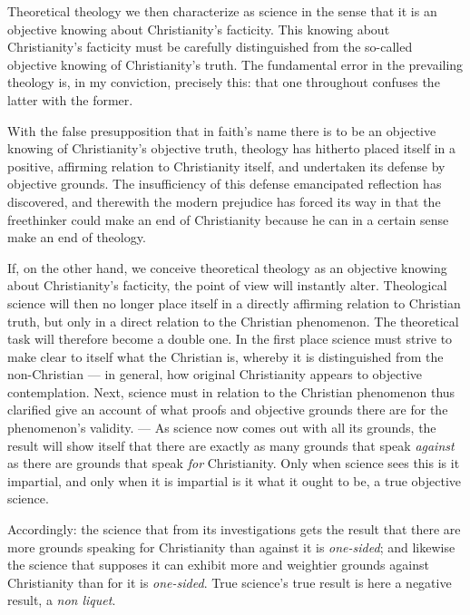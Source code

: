 \documentclass[12pt,a4paper]{book}
\begin{document}
Theoretical theology we then characterize as science in the sense that it is an objective knowing
about Christianity's facticity. This knowing about Christianity's facticity must be carefully
distinguished from the so-called objective knowing of Christianity's truth. The fundamental error in
the prevailing theology is, in my conviction, precisely this: that one throughout confuses the
latter with the former.

With the false presupposition that in faith's name there is to be an objective knowing of
Christianity's objective truth, theology has hitherto placed itself in a positive, affirming
relation to Christianity itself, and undertaken its defense by objective grounds. The insufficiency
of this defense emancipated reflection has discovered, and therewith the modern prejudice has forced
its way in that the freethinker could make an end of Christianity because he can in a certain sense
make an end of theology.

If, on the other hand, we conceive theoretical theology as an objective knowing about Christianity's
facticity, the point of view will instantly alter. Theological science will then no longer place
itself in a directly affirming relation to Christian truth, but only in a direct relation to the
Christian phenomenon. The theoretical task will therefore become a double one. In the first place
science must strive to make clear to itself what the Christian is, whereby it is distinguished from
the non-Christian --- in general, how original Christianity appears to objective contemplation. Next,
science must in relation to the Christian phenomenon thus clarified give an account of what proofs
and objective grounds there are for the phenomenon's validity. --- As science now comes out with
all its grounds, the result will show itself that there are exactly as many grounds that speak
\emph{against} as there are grounds that speak \emph{for} Christianity. Only when science sees this
is it impartial, and only when it is impartial is it what it ought to be, a true objective science.

Accordingly: the science that from its investigations gets the result that there are more grounds
speaking for Christianity than against it is \emph{one-sided}; and likewise the science that supposes
it can exhibit more and weightier grounds against Christianity than for it is \emph{one-sided}. True
science's true
result is here a negative result, a \textit{non liquet}.
\end{document}
